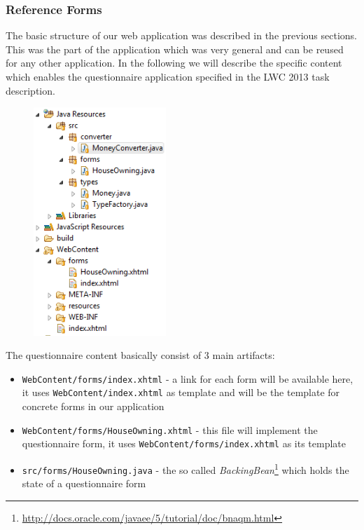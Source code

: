 \subsubsection{Reference Forms}
\label{subsec:referenceForms}
The basic structure of our web application was described in the previous
sections. This was the part of the application which was very general and can be
reused for any other application. In the following we will describe the specific
content which enables the questionnaire application specified in the LWC 2013
task description. 

\begin{figure}
 \includegraphics[width=5cm]{./images/chapter02/referenceimpl_forms.png}
\end{figure}

The questionnaire content basically consist of 3 main artifacts:

\begin{itemize}
\item \texttt{WebContent/forms/index.xhtml} - a link for each form will be
available here, it uses \texttt{WebContent/index.xhtml} as template and will be
the template for concrete forms in our application
\item \texttt{WebContent/forms/HouseOwning.xhtml} - this file will implement the
questionnaire form, it uses \newline\texttt{WebContent/forms/index.xhtml} as its
template
\item \texttt{src/forms/HouseOwning.java} - the so called
\emph{BackingBean}\footnote{\url{http://docs.oracle.com/javaee/5/tutorial/doc/bnaqm.html}}
which holds the state of a questionnaire form
\end{itemize}

